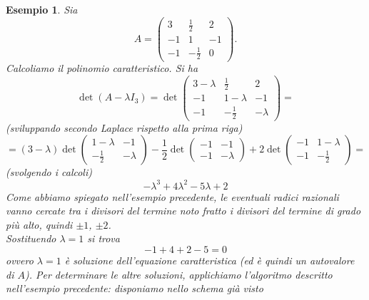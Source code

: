 \documentclass{book}
\newtheorem{esempio}{Esempio}[section]
\begin{document}
\begin{esempio}
  \label{es:5.2.3.}
  Sia
  \begin{equation*}
    A=
    \begin{pmatrix}
      3& \frac{1}{2} & 2\\
      -1 & 1 & -1\\
      -1 & -\frac{1}{2} & 0
    \end{pmatrix}.
  \end{equation*}
  Calcoliamo il polinomio caratteristico. Si ha
  \begin{equation*}
    \det (A-\lambda I_3)=\det
    \begin{pmatrix}
      3 -\lambda & \frac{1}{2} &2\\
      -1 & 1 - \lambda & -1\\
      -1 & -\frac{1}{2} & -\lambda
    \end{pmatrix}=
  \end{equation*}
  (sviluppando secondo Laplace rispetto alla prima riga)
  \begin{equation*}
    =(3-\lambda)\det
    \begin{pmatrix}
      1-\lambda & -1\\
      -\frac{1}{2} & -\lambda
    \end{pmatrix}-\frac{1}{2}\det
    \begin{pmatrix}
      -1 & -1\\
      -1 & -\lambda
    \end{pmatrix}+ 2\det
    \begin{pmatrix}
      -1 & 1-\lambda\\
      -1 & -\frac{1}{2}
    \end{pmatrix}=
  \end{equation*}
  (svolgendo i calcoli)
  \begin{equation*}
   -\lambda^3+4\lambda^2-5\lambda+2 
 \end{equation*}
 Come abbiamo spiegato nell’esempio precedente, le eventuali radici razionali vanno cercate tra i divisori del
 termine noto fratto i divisori del termine di grado più alto, quindi $\pm 1$, $\pm 2$. \\
 Sostituendo $\lambda=1$ si trova
 \begin{equation*}
   -1+4+2-5=0
 \end{equation*}
 ovvero $\lambda=1$ è soluzione dell'equazione caratteristica (ed è quindi un autovalore di $A$). Per determinare
 le altre soluzioni, applichiamo l'algoritmo descritto nell'esempio precedente: disponiamo nello schema già visto

\end{esempio}
\end{document}
